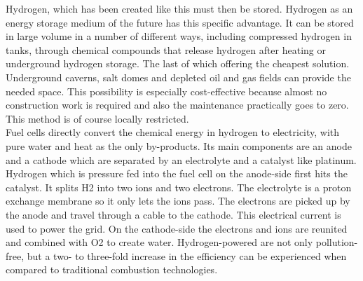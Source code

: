 \begin{parcolumns}[colwidths={1=2.5 cm, 2=10 cm, 3=2.5cm}]{3}
{Hydrogen, which has been created like this must then be stored. Hydrogen as an energy storage medium of the future has this specific advantage. It can be stored in large volume in a number of different ways, including compressed hydrogen in tanks, through chemical compounds that release hydrogen after heating or underground hydrogen storage. The last of which offering the cheapest solution. Underground caverns, salt domes and depleted oil and gas fields can provide the needed space. This possibility is especially cost-effective because almost no construction work is required and also the maintenance practically goes to zero. This method is of course locally restricted.
\\
Fuel cells directly convert the chemical energy in hydrogen to electricity, with pure water and heat as the only by-products. Its main components are an anode and a cathode which are separated by an electrolyte and a catalyst like platinum. Hydrogen which is pressure fed into the fuel cell on the anode-side first hits the catalyst. It splits H2 into two ions and two electrons. The electrolyte is a proton exchange membrane so it only lets the ions pass. The electrons are picked up by the anode and travel through a cable to the cathode. This electrical current is used to power the grid. On the cathode-side the electrons and ions are reunited and combined with O2 to create water. Hydrogen-powered are not only pollution-free, but a two- to three-fold increase in the efficiency can be experienced when compared to traditional combustion technologies.
\\



}
\end{parcolumns}
